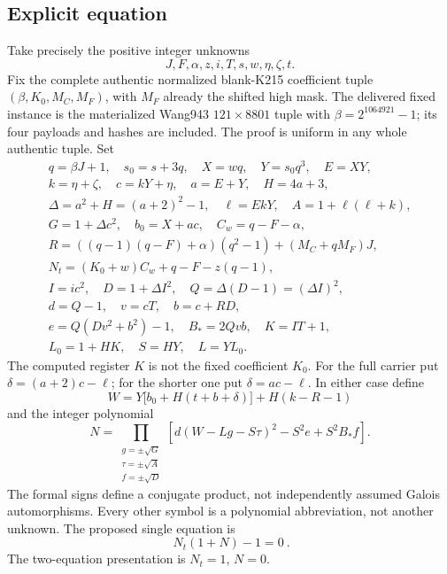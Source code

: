 \subsection{Explicit equation}
Take precisely the positive integer unknowns
\[
 J,F,\alpha,z,i,T,s,w,\eta,\zeta,t.
\]
Fix the complete authentic normalized blank-K215 coefficient tuple
$(\beta,K_0,M_C,M_F)$, with $M_F$ already the shifted high mask.
The delivered fixed instance is the materialized Wang943
$121\times8801$ tuple with $\beta=2^{1064921}-1$; its four payloads and
hashes are included. The proof is uniform in any whole authentic tuple.
Set
\begin{gather*}
 q=\beta J+1,\quad s_0=s+3q,\quad X=wq,\quad Y=s_0q^3,\quad E=XY,\\
 k=\eta+\zeta,\quad c=kY+\eta,\quad a=E+Y,\quad H=4a+3,\\
 \Delta=a^2+H=(a+2)^2-1,\quad \ell=EkY,\quad A=1+\ell(\ell+k),\\
 G=1+\Delta c^2,\quad b_0=X+ac,\quad C_w=q-F-\alpha,\\
 R=((q-1)(q-F)+\alpha)(q^2-1)+(M_C+qM_F)J,\\
 N_t=(K_0+w)C_w+q-F-z(q-1),\\
 I=ic^2,\quad D=1+\Delta I^2,\quad Q=\Delta(D-1)=(\Delta I)^2,\\
 d=Q-1,\quad v=cT,\quad b=c+RD,\\
 e=Q(Dv^2+b^2)-1,\quad B_*=2Qvb,\quad K=IT+1,\\
 L_0=1+HK,\quad S=HY,\quad L=YL_0.
\end{gather*}
The computed register $K$ is not the fixed coefficient $K_0$.
For the full carrier put $\delta=(a+2)c-\ell$; for the shorter one put
$\delta=ac-\ell$. In either case define
\[
 W=Y\bigl[b_0+H(t+b+\delta)\bigr]+H(k-R-1)
\]
and the integer polynomial
\begin{equation}\label{eq:new-eleven-norm}
 N=\prod_{\substack{g=\pm\sqrt G\\\tau=\pm\sqrt A\\f=\pm\sqrt D}}
 \left[d(W-Lg-S\tau)^2-S^2e+S^2B_*f\right].
\end{equation}
The formal signs define a conjugate product, not independently assumed
Galois automorphisms. Every other symbol is a polynomial abbreviation,
not another unknown. The proposed single equation is
\begin{equation}\label{eq:new-eleven-single}
 \boxed{\ N_t(1+N)-1=0\ }.
\end{equation}
The two-equation presentation is $N_t=1$, $N=0$.

